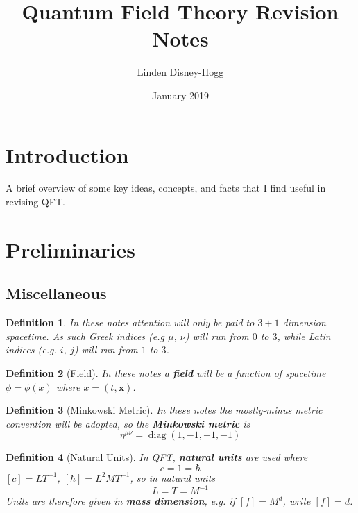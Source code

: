 \documentclass{article}
\title{Quantum Field Theory Revision Notes}
\author{Linden Disney-Hogg}
\date{January 2019}
\newtheorem{definition}{Definition}[subsection]
\DeclareMathOperator{\diag}{diag}
\newcommand{\bam}[1]{\textbf{#1}}
\begin{document}
\maketitle
\tableofcontents

\section{Introduction}
A brief overview of some key ideas, concepts, and facts that I find useful in revising QFT. 

\section{Preliminaries}

\subsection{Miscellaneous}

\begin{definition}
In these notes attention will only be paid to $3+1$ dimension spacetime. As such Greek indices (e.g $\mu$, $\nu$) will run from $0$ to $3$, while Latin indices (e.g. $i$, $j$) will run from $1$ to $3$. 
\end{definition}

\begin{definition}[Field]
In these notes a \bam{field} will be a function of spacetime $\phi=\phi(x)$ where $x=(t,\bm{x})$. 
\end{definition}

\begin{definition}[Minkowski Metric]
In these notes the mostly-minus metric convention will be adopted, so the \bam{Minkowski metric} is 
\[
\eta^{\mu\nu}=\diag(1, -1, -1, -1)
\]
\end{definition}

\begin{definition}[Natural Units]
In QFT, \bam{natural units} are used where
\[
c=1=\hbar
\]
$[c]=LT^{-1}$, $[\hbar]=L^2 M T^{-1}$, so in natural units
\[
L=T=M^{-1}
\]
Units are therefore given in \bam{mass dimension}, e.g. if $[f]=M^d$, write $[f]=d$.
\end{definition}
\end{document}
